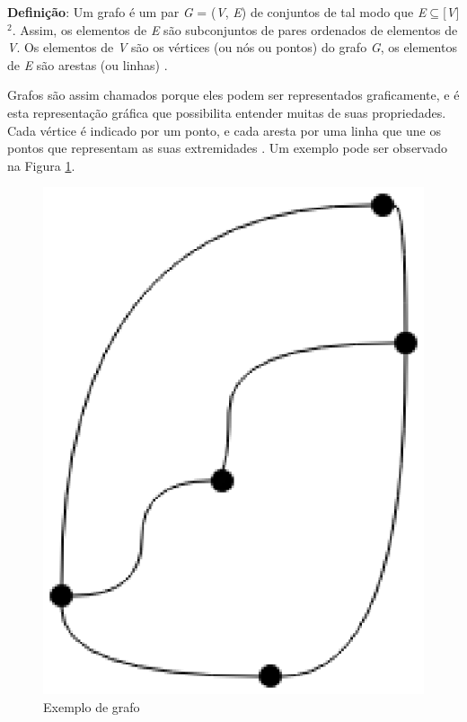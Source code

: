 \textbf{Definição}: Um grafo é um par \textit{G} = (\textit{V}, \textit{E}) de conjuntos de tal modo que \textit{E}$\subseteq$[\textit{V}]$^2$. Assim, os elementos de \textit{E} são subconjuntos de pares ordenados de elementos de \textit{V}. Os elementos de \textit{V} são os vértices (ou nós ou pontos) do grafo \textit{G}, os elementos de \textit{E} são arestas (ou linhas) \cite{Diestel:1997}.

Grafos são assim chamados porque eles podem ser representados graficamente, e é esta representação gráfica que possibilita entender muitas de suas propriedades. Cada vértice é indicado por um ponto, e cada aresta por uma linha que une os pontos que representam as suas extremidades \cite{Bondy:2007}. Um exemplo pode ser observado na Figura \ref{exemplo_grafo}.

\begin{figure}[!h]
	\centering
	\includegraphics[scale=0.3]{figuras/referencial_teorico/exemplo_grafo.eps}
	\caption[Exemplo de grafo]{Exemplo de grafo \cite{Bondy:2007}}
	\label{exemplo_grafo}
\end{figure}

